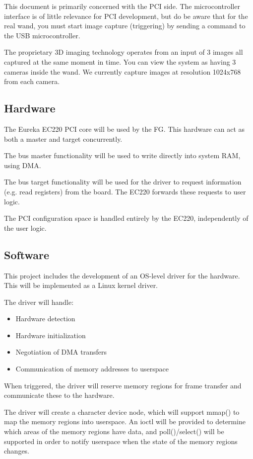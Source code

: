 \documentclass[12pt]{article}
\begin{document}
This document is primarily concerned with the PCI side. The microcontroller interface is of little relevance for PCI development, but do be aware that for the real wand, you must start image capture (triggering) by sending a command to the USB microcontroller.

The proprietary 3D imaging technology operates from an input of 3 images all captured at the same moment in time. You can view the system as having 3 cameras inside the wand. We currently capture images at resolution 1024x768 from each camera.

\subsection{Hardware}

The Eureka EC220 PCI core will be used by the FG. This hardware can act as both a master and target concurrently.

The bus master functionality will be used to write directly into system RAM, using DMA.

The bus target functionality will be used for the driver to request information (e.g. read registers) from the board. The EC220 forwards these requests to user logic.

The PCI configuration space is handled entirely by the EC220, independently of the user logic.

\subsection{Software}

This project includes the development of an OS-level driver for the hardware. This will be implemented as a Linux kernel driver.

The driver will handle:
\begin{itemize}
\item Hardware detection
\item Hardware initialization
\item Negotiation of DMA transfers
\item Communication of memory addresses to userspace
\end{itemize}

When triggered, the driver will reserve memory regions for frame transfer and communicate these to the hardware.

The driver will create a character device node, which will support mmap() to map the memory regions into userspace. An ioctl will be provided to determine which areas of the memory regions have data, and poll()/select() will be supported in order to notify userspace when the state of the memory regions changes.
\end{document}
